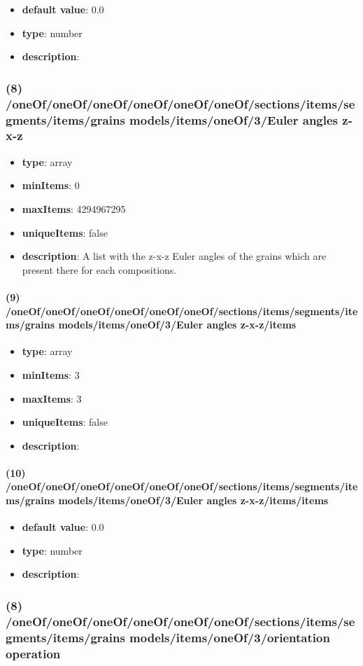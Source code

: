 \begin{itemize}[leftmargin=11em]\item {\bf default value}: 0.0
\item {\bf type}: number
\item {\bf description}: 
\end{itemize}\subsubsection{(8) /oneOf/oneOf/oneOf/oneOf/oneOf/oneOf/sections/items/segments/items/grains models/items/oneOf/3/Euler angles z-x-z}
\begin{itemize}[leftmargin=8em]\item {\bf type}: array
\item {\bf minItems}: 0
\item {\bf maxItems}: 4294967295
\item {\bf uniqueItems}: false
\item {\bf description}: A list with the z-x-z Euler angles of the grains which are present there for each compositions.
\end{itemize}\paragraph{(9) /oneOf/oneOf/oneOf/oneOf/oneOf/oneOf/sections/items/segments/items/grains models/items/oneOf/3/Euler angles z-x-z/items}
\begin{itemize}[leftmargin=9em]\item {\bf type}: array
\item {\bf minItems}: 3
\item {\bf maxItems}: 3
\item {\bf uniqueItems}: false
\item {\bf description}: 
\end{itemize}\paragraph{(10) /oneOf/oneOf/oneOf/oneOf/oneOf/oneOf/sections/items/segments/items/grains models/items/oneOf/3/Euler angles z-x-z/items/items}
\begin{itemize}[leftmargin=10em]\item {\bf default value}: 0.0
\item {\bf type}: number
\item {\bf description}: 
\end{itemize}\subsubsection{(8) /oneOf/oneOf/oneOf/oneOf/oneOf/oneOf/sections/items/segments/items/grains models/items/oneOf/3/orientation operation}
